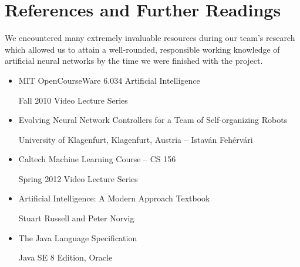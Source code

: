 \documentclass[letterpaper, 10pt]{article}
\begin{document}
\section{References and Further Readings}
	We encountered many extremely invaluable resources during our team's research which allowed us to attain a well-rounded, responsible working knowledge of artificial neural networks by the time we were finished with the project.

	\large
	\vspace{0.65cm}

	\begin{itemize}
		\item MIT OpenCourseWare 6.034 Artificial Intelligence
		
			\hspace{1.5cm} Fall 2010 Video Lecture Series
		\item Evolving Neural Network Controllers for a Team of Self-organizing Robots
		
			\hspace{1.5cm} University of Klagenfurt, Klagenfurt, Austria -- Istav\'{a}n Feh\'{e}rv\'{a}ri
		\item Caltech Machine Learning Course -- CS 156
		
			\hspace{1.5cm} Spring 2012 Video Lecture Series
		\item Artificial Intelligence: A Modern Approach Textbook
			
			\hspace{1.5cm} Stuart Russell and Peter Norvig
		\item The Java Language Specification
			
			\hspace{1.5cm} Java SE 8 Edition, Oracle
	\end{itemize}
\end{document}

